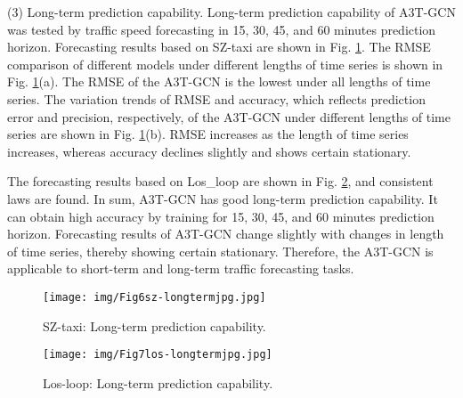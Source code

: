 \documentclass[10pt,journal,compsoc]{IEEEtran}
\begin{document}
\par (3) Long-term prediction capability. Long-term prediction capability of A3T-GCN was tested by traffic speed forecasting in 15, 30, 45, and 60 minutes prediction horizon.
Forecasting results based on SZ-taxi are shown in Fig. \ref{fig:6}. The RMSE comparison of different models under different lengths of time series is shown in Fig. \ref{fig:6}(a). The RMSE of the A3T-GCN is the lowest under all lengths of time series. The variation trends of RMSE and accuracy, which reflects prediction error and precision, respectively, of the A3T-GCN under different lengths of time series are shown in Fig. \ref{fig:6}(b). RMSE increases as the length of time series increases, whereas accuracy declines slightly and shows certain stationary.
\par The forecasting results based on Los\_loop are shown in Fig. \ref{fig:7}, and consistent laws are found. In sum, A3T-GCN has good long-term prediction capability. It can obtain high accuracy by training for 15, 30, 45, and 60 minutes prediction horizon. Forecasting results of A3T-GCN change slightly with changes in length of time series, thereby showing certain stationary. Therefore, the A3T-GCN is applicable to short-term and long-term traffic forecasting tasks.



\begin{figure}
\begin{center}
   \texttt{[image: img/Fig6sz-longtermjpg.jpg]}
   \end{center}
   \caption{ SZ-taxi: Long-term prediction capability.}
\label{fig:6}
\end{figure}

\begin{figure}
\begin{center}
   \texttt{[image: img/Fig7los-longtermjpg.jpg]}
   \end{center}
   \caption{Los-loop: Long-term prediction capability.}
\label{fig:7}
\end{figure}
\end{document}
